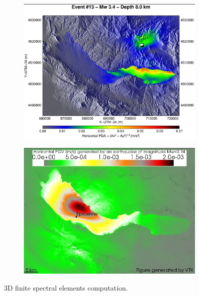 \begin{figure}[!ht]
  \centering
  \begin{subfigure}{.4\textwidth}
    \includegraphics[width=\textwidth]{img/efispec1.png}
  \end{subfigure}
  \begin{subfigure}{.4\textwidth}
    \includegraphics[width=\textwidth]{img/efispec2.png}
  \end{subfigure}
  \caption{3D finite spectral elements computation.}
\end{figure}
